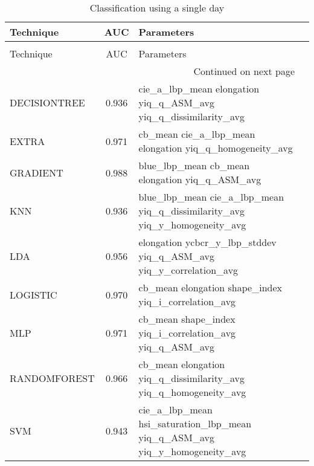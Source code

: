 \begin{longtable}{lcll}
\caption[Classification using a single day]{Classification using a single day}
\label{table:results-single-day}\\
\toprule
   Technique &   AUC &                                                                 Parameters \\
\midrule
\endfirsthead
\caption[]{Classification using a single day} \\
\toprule
   Technique &   AUC &                                                                 Parameters \\
\midrule
\endhead
\midrule
\multicolumn{3}{r}{{Continued on next page}} \\
\midrule
\endfoot

\bottomrule
\endlastfoot
DECISIONTREE & 0.936 &          cie\_a\_lbp\_mean elongation yiq\_q\_ASM\_avg yiq\_q\_dissimilarity\_avg \\
       EXTRA & 0.971 &                    cb\_mean cie\_a\_lbp\_mean elongation yiq\_q\_homogeneity\_avg \\
    GRADIENT & 0.988 &                             blue\_lbp\_mean cb\_mean elongation yiq\_q\_ASM\_avg \\
         KNN & 0.936 & blue\_lbp\_mean cie\_a\_lbp\_mean yiq\_q\_dissimilarity\_avg yiq\_y\_homogeneity\_avg \\
         LDA & 0.956 &          elongation ycbcr\_y\_lbp\_stddev yiq\_q\_ASM\_avg yiq\_y\_correlation\_avg \\
    LOGISTIC & 0.970 &                       cb\_mean elongation shape\_index yiq\_i\_correlation\_avg \\
         MLP & 0.971 &                    cb\_mean shape\_index yiq\_i\_correlation\_avg yiq\_q\_ASM\_avg \\
RANDOMFOREST & 0.966 &           cb\_mean elongation yiq\_q\_dissimilarity\_avg yiq\_q\_homogeneity\_avg \\
         SVM & 0.943 & cie\_a\_lbp\_mean hsi\_saturation\_lbp\_mean yiq\_q\_ASM\_avg yiq\_y\_homogeneity\_avg \\
\end{longtable}

